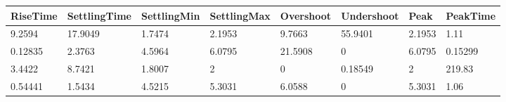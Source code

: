 \begin{tabular}{llllllll}
RiseTime & SettlingTime & SettlingMin & SettlingMax & Overshoot & Undershoot & Peak & PeakTime \\ 
\hline 
9.2594 & 17.9049 & 1.7474 & 2.1953 & 9.7663 & 55.9401 & 2.1953 & 1.11 \\ 
0.12835 & 2.3763 & 4.5964 & 6.0795 & 21.5908 & 0 & 6.0795 & 0.15299 \\ 
3.4422 & 8.7421 & 1.8007 & 2 & 0 & 0.18549 & 2 & 219.83 \\ 
0.54441 & 1.5434 & 4.5215 & 5.3031 & 6.0588 & 0 & 5.3031 & 1.06 \\ 
\hline 
\end{tabular}